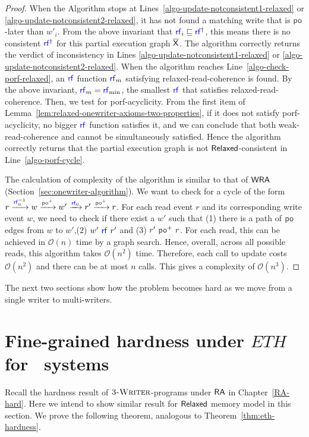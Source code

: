 \begin{proof}
When the Algorithm stops at Lines~\ref{algo-update-notconsistent1-relaxed} or \ref{algo-update-notconsistent2-relaxed}, it has not found a matching write that is $\po$-later than $w'_i$. From the above invariant that $\rf_i \sqsubseteq \rf^{\dagger}$, this means there is no consistent $\rf^\dagger$ for this partial execution graph $\overline{\mathsf{\color{black}X}}$. The algorithm correctly returns the verdict of inconsistency in Lines \ref{algo-update-notconsistent1-relaxed} or \ref{algo-update-notconsistent2-relaxed}. When the algorithm reaches Line~\ref{algo-check-porf-relaxed}, an $\rf$ function $\rf_m$ satisfying relaxed-read-coherence is found. By the above invariant, $\rf_m = \rf_{\min}$, the smallest $\rf$ that satisfies relaxed-read-coherence. Then, we test for porf-acyclicity. From the first item of Lemma~\ref{lem:relaxed-onewriter-axioms-two-properties}, if it does not satisfy porf-acyclicity, no bigger $\rf$ function satisfies it, and we can conclude that both weak-read-coherence and \PORF{} cannot be simultaneously satisfied. Hence the algorithm correctly returns that the partial execution graph is not $\mathsf{Relaxed}$-consistent in Line~\ref{algo-porf-cycle}.


The calculation of complexity of the algorithm is similar to that of $\mathsf{WRA}$ (Section~\ref{sec:onewriter-algorithm}). We want to check for a cycle of the form  $r \xra{\rf_0^{-1}} w \xra{\po^+} w' \xra{\rf_0} r' \xra{\po^+} r$. 
For each read event $r$ and its corresponding write event $w$, we need to check if there exist a $w'$ such that (1) there is a path of $\po$ edges from $w$ to $w'$,(2) $w'~\rf~r'$ and (3) $r'~\po^+~r$. For each read, this can be achieved in $\mathcal{O}(n)$ time by a graph search. Hence, overall, across all possible reads, this algorithm takes $\mathcal{O}(n^2)$ time. Therefore, each call to update costs $\mathcal{O}(n^2)$ and there can be at most $n$ calls. This gives a complexity of $\mathcal{O}(n^3)$.
\end{proof}

The next two sections show how the problem becomes hard as we move from a single writer to multi-writers.

\section{Fine-grained hardness under $ETH$ for \threewriter\ systems}
\label{sec:finegrained-relaxed}

Recall the hardness result of $\textsc{3-Writer}$-programs under $\mathsf{RA}$ in Chapter~\ref{RA-hard}. Here we intend to show similar result for $\mathsf{Relaxed}$ memory model in this section. We prove the following theorem, analogous to Theorem~\ref{thm:eth-hardness}.   

